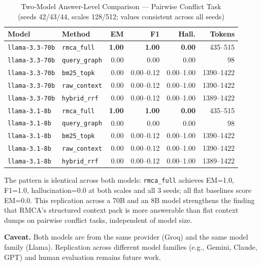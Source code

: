 \documentclass[conference]{IEEEtran}
\begin{document}
\begin{table}[htbp]
\caption{Two-Model Answer-Level Comparison --- Pairwise Conflict Task\\
(seeds 42/43/44, scales 128/512; values consistent across all seeds)}
\label{tab:two_model}
\centering
\begin{tabular}{llrrrr}
\toprule
\textbf{Model} & \textbf{Method} & \textbf{EM} & \textbf{F1} & \textbf{Hall.} & \textbf{Tokens} \\
\midrule
\texttt{llama-3.3-70b} & \texttt{rmca\_full}   & \textbf{1.00} & \textbf{1.00} & \textbf{0.00} & 435--515 \\
\texttt{llama-3.3-70b} & \texttt{query\_graph} & 0.00 & 0.00 & 0.00 & 98 \\
\texttt{llama-3.3-70b} & \texttt{bm25\_topk}   & 0.00 & 0.00--0.12 & 0.00--1.00 & 1390--1422 \\
\texttt{llama-3.3-70b} & \texttt{raw\_context} & 0.00 & 0.00--0.12 & 0.00--1.00 & 1390--1422 \\
\texttt{llama-3.3-70b} & \texttt{hybrid\_rrf}  & 0.00 & 0.00--0.12 & 0.00--1.00 & 1389--1422 \\
\midrule
\texttt{llama-3.1-8b}  & \texttt{rmca\_full}   & \textbf{1.00} & \textbf{1.00} & \textbf{0.00} & 435--515 \\
\texttt{llama-3.1-8b}  & \texttt{query\_graph} & 0.00 & 0.00 & 0.00 & 98 \\
\texttt{llama-3.1-8b}  & \texttt{bm25\_topk}   & 0.00 & 0.00--0.12 & 0.00--1.00 & 1390--1422 \\
\texttt{llama-3.1-8b}  & \texttt{raw\_context} & 0.00 & 0.00--0.12 & 0.00--1.00 & 1390--1422 \\
\texttt{llama-3.1-8b}  & \texttt{hybrid\_rrf}  & 0.00 & 0.00--0.12 & 0.00--1.00 & 1389--1422 \\
\bottomrule
\end{tabular}
\end{table}

The pattern is identical across both models: \texttt{rmca\_full} achieves EM=1.0, F1=1.0,
hallucination=0.0 at both scales and all 3 seeds; all flat baselines score EM=0.0.
This replication across a 70B and an 8B model strengthens the finding that RMCA's
structured context pack is more answerable than flat context dumps on pairwise conflict
tasks, independent of model size.

\textbf{Caveat.} Both models are from the same provider (Groq) and the same model family
(Llama). Replication across different model families (e.g., Gemini, Claude, GPT) and
human evaluation remains future work.
\end{document}
